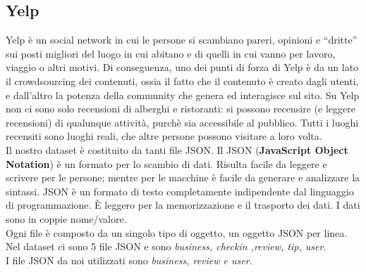 \subsection{Yelp}
Yelp è un social network in cui le persone si scambiano pareri, opinioni e “dritte” sui posti migliori del luogo in cui abitano e di quelli in cui vanno per lavoro, viaggio o altri motivi. Di conseguenza, uno dei punti di forza di Yelp è da un lato il crowdsourcing dei contenuti, ossia il fatto che il contenuto è creato dagli utenti, e dall’altro la potenza della community che genera ed interagisce sul sito.
Su Yelp non ci sono solo recensioni di alberghi e ristoranti: si possono recensire (e leggere recensioni) di qualunque attività, purchè sia accessibile al pubblico. Tutti i luoghi recensiti sono luoghi reali, che altre persone possono visitare a loro volta.\\
Il nostro dataset è costituito da tanti file JSON.
Il JSON (\textbf{JavaScript Object Notation}) è un formato per lo scambio di dati. Risulta facile da leggere e scrivere per le persone; mentre per le macchine è facile da generare e analizzare la sintassi.
JSON è un formato di testo completamente indipendente dal linguaggio di programmazione. È leggero per la memorizzazione e il trasporto dei dati. I dati sono in coppie nome/valore.\\
Ogni file è composto da un singolo tipo di oggetto, un oggetto JSON per linea. \newline
Nel dataset ci sono 5 file JSON e sono \textit{business, checkin ,review, tip, user}.\\
I file JSON da noi utilizzati sono \textit{business, review e user}.

